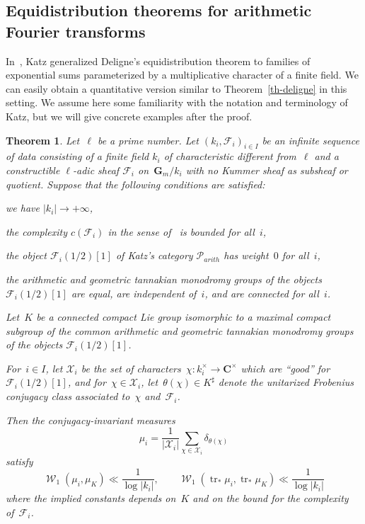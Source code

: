 \documentclass[12pt]{amsart}
\renewcommand{\mathcal}{\mathscr}
\newcommand{\Cc}{\mathbf{C}}
\newcommand{\Gg}{\mathbf{G}}
\DeclareMathOperator{\wass}{\mathcal{W}}
\DeclareMathOperator{\Tr}{tr}
\theoremstyle{plain}
\newtheorem{theorem}{Theorem}[section]
\theoremstyle{remark}
\theoremstyle{definition}
\newtheorem{remark}[theorem]{Remark}
\begin{document}
 

\subsection{Equidistribution theorems for arithmetic Fourier
  transforms}

In~\cite{mellin}, Katz generalized Deligne's equidistribution theorem
to families of exponential sums parameterized by a multiplicative
character of a finite field. We can easily obtain a quantitative
version similar to Theorem~\ref{th-deligne} in this setting. We assume
here some familiarity with the notation and terminology of Katz, but
we will give concrete examples after the proof.

\begin{theorem}\label{th-katz}
  Let~$\ell$ be a prime number.  Let $(k_i,\mathcal{F}_i)_{i\in I}$ be
  an infinite sequence of data consisting of a finite field $k_i$ of
  characteristic different from~$\ell$ and a constructible $\ell$-adic
  sheaf $\mathcal{F}_i$ on~$\Gg_m/k_i$ with no Kummer sheaf as
  subsheaf or quotient. Suppose that the following conditions are
  satisfied:
  \begin{enumth}
  \item we have $|k_i|\to +\infty$,
  \item the complexity $c(\mathcal{F}_i)$ in the sense of~\cite{sffk}
    is bounded for all~$i$,
  \item the object $\mathcal{F}_i(1/2)[1]$ of Katz's category
    $\mathcal{P}_{arith}$ has weight~$0$ for all~$i$,
  \item the arithmetic and geometric tannakian monodromy groups of the
    objects $\mathcal{F}_i(1/2)[1]$ are equal, are independent of~$i$,
    and are connected for all~$i$.
  \end{enumth}

  Let~$K$ be a connected compact Lie group isomorphic to a maximal
  compact subgroup of the common arithmetic and geometric tannakian
  monodromy groups of the objects $\mathcal{F}_i(1/2)[1]$.

  For~$i\in I$, let $\mathcal{X}_i$ be the set of
  characters~$\chi\colon k_i^{\times}\to \Cc^{\times}$ which are
  ``good'' for~$\mathcal{F}_i(1/2)[1]$, and
  for~$\chi\in \mathcal{X}_i$, let~$\theta(\chi)\in K^{\sharp}$ denote
  the unitarized Frobenius conjugacy class associated to~$\chi$
  and~$\mathcal{F}_i$.

  Then the conjugacy-invariant measures
  \[
    \mu_i=\frac{1}{|\mathcal{X}_i|} \sum_{\chi \in
      \mathcal{X}_i}\delta_{\theta(\chi)}
  \]
  satisfy
  \begin{equation}\label{eq-wass-katz}
    \wass_1(\mu_i,\mu_K)\ll \frac{1}{\log |k_i|},\quad\quad
    \wass_1(\Tr_*\mu_i,\Tr_*\mu_K)\ll \frac{1}{\log |k_i|}
  \end{equation}
  where the implied constants depends on~$K$ and on the bound for the
  complexity of~$\mathcal{F}_i$.
\end{theorem}
\end{document}
